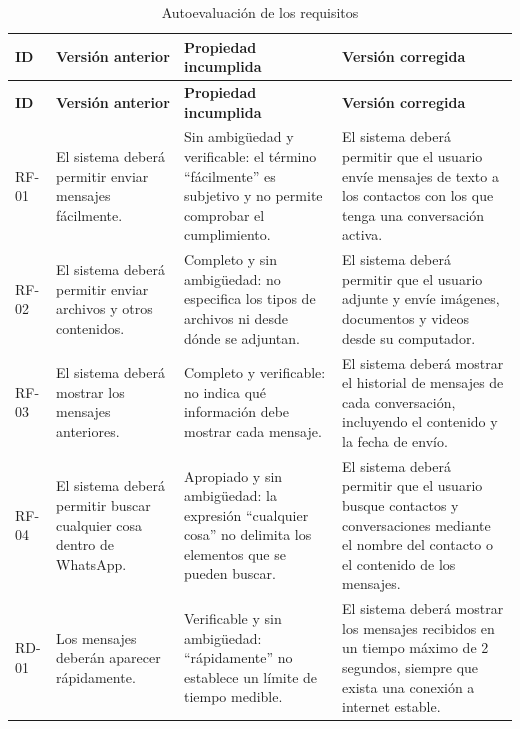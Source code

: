 \documentclass[12pt,a4paper,oneside]{article}
\begin{document}
\small
\begin{longtable}{C{1.3cm} L{4.0cm} L{3.6cm} L{4.2cm}}

\caption{Autoevaluación de los requisitos}\label{tab:auto}\\

\toprule
\textbf{ID} &
\textbf{Versión anterior} &
\textbf{Propiedad incumplida} &
\textbf{Versión corregida} \\

\midrule
\endfirsthead

\toprule
\textbf{ID} &
\textbf{Versión anterior} &
\textbf{Propiedad incumplida} &
\textbf{Versión corregida} \\

\midrule
\endhead

\bottomrule
\endfoot

RF-01 &
El sistema deberá permitir enviar mensajes fácilmente. &
Sin ambigüedad y verificable: el término ``fácilmente'' es subjetivo y no permite comprobar el cumplimiento. &
El sistema deberá permitir que el usuario envíe mensajes de texto a los contactos con los que tenga una conversación activa. \\

RF-02 &
El sistema deberá permitir enviar archivos y otros contenidos. &
Completo y sin ambigüedad: no especifica los tipos de archivos ni desde dónde se adjuntan. &
El sistema deberá permitir que el usuario adjunte y envíe imágenes, documentos y videos desde su computador. \\

RF-03 &
El sistema deberá mostrar los mensajes anteriores. &
Completo y verificable: no indica qué información debe mostrar cada mensaje. &
El sistema deberá mostrar el historial de mensajes de cada conversación, incluyendo el contenido y la fecha de envío. \\

RF-04 &
El sistema deberá permitir buscar cualquier cosa dentro de WhatsApp. &
Apropiado y sin ambigüedad: la expresión ``cualquier cosa'' no delimita los elementos que se pueden buscar. &
El sistema deberá permitir que el usuario busque contactos y conversaciones mediante el nombre del contacto o el contenido de los mensajes. \\

RD-01 &
Los mensajes deberán aparecer rápidamente. &
Verificable y sin ambigüedad: ``rápidamente'' no establece un límite de tiempo medible. &
El sistema deberá mostrar los mensajes recibidos en un tiempo máximo de 2 segundos, siempre que exista una conexión a internet estable. \\


\end{longtable}
\end{document}
